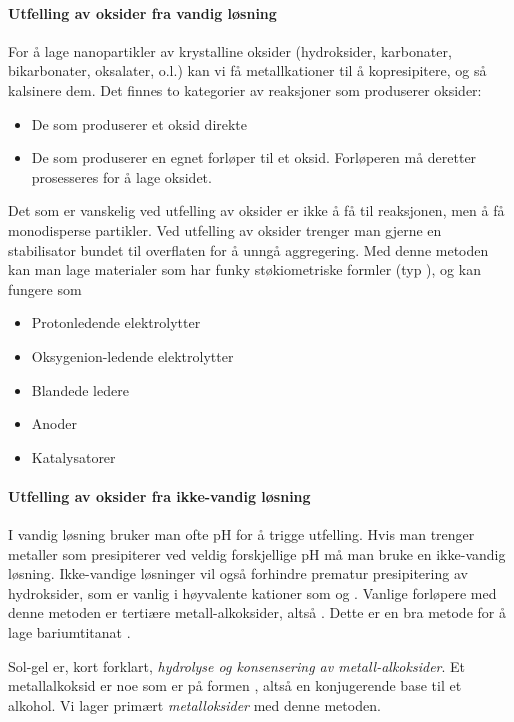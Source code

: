 \paragraph{Utfelling av oksider fra vandig løsning} For å lage nanopartikler av krystalline oksider (hydroksider, karbonater, bikarbonater, oksalater, o.l.) kan vi få metallkationer til å kopresipitere, og så kalsinere dem. Det finnes to kategorier av reaksjoner som produserer oksider:
\begin{itemize}
	\item De som produserer et oksid direkte
	\item De som produserer en egnet forløper til et oksid. Forløperen må deretter prosesseres for å lage oksidet.
\end{itemize}
Det som er vanskelig ved utfelling av oksider er ikke å få til reaksjonen, men å få monodisperse partikler. Ved utfelling av oksider trenger man gjerne en stabilisator bundet til overflaten for å unngå aggregering. Med denne metoden kan man lage materialer som har funky støkiometriske formler (typ ), og kan fungere som
\begin{itemize}
	\item Protonledende elektrolytter
	\item Oksygenion-ledende elektrolytter
	\item Blandede ledere
	\item Anoder
	\item Katalysatorer
\end{itemize}

\paragraph{Utfelling av oksider fra ikke-vandig løsning} I vandig løsning bruker man ofte pH for å trigge utfelling. Hvis man trenger metaller som presipiterer ved veldig forskjellige pH må man bruke en ikke-vandig løsning. Ikke-vandige løsninger vil også forhindre prematur presipitering av hydroksider, som er vanlig i høyvalente kationer som  og . Vanlige forløpere med denne metoden er tertiære metall-alkoksider, altså . Dette er en bra metode for å lage bariumtitanat . 

Sol-gel er, kort forklart, \emph{hydrolyse og konsensering av metall-alkoksider}. Et metallalkoksid er noe som er på formen , altså en konjugerende base til et alkohol. Vi lager primært \emph{metalloksider} med denne metoden.

